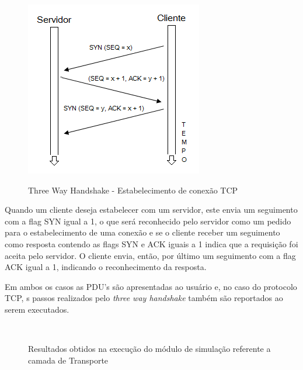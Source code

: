 \begin{figure}
	\centering
	\includegraphics{04-figuras/3wh.png}
	\caption{Three Way Handshake - Estabelecimento de conexão TCP}
	\cite{TANENBAUM}
	\label{fig:3wh}
\end{figure}

Quando um cliente deseja estabelecer  com  um servidor, este envia um seguimento com a flag SYN igual a 1, o que ser\'a reconhecido pelo servidor como um pedido para o estabelecimento de uma conex\~ao e se o cliente receber um seguimento como resposta contendo as flags SYN e ACK iguais a 1 indica que a requisiç\~ao foi aceita pelo servidor. O cliente envia, ent\~ao, por \'ultimo um seguimento com a flag ACK igual a 1, indicando o reconhecimento da resposta.

Em ambos os casos as PDU's são apresentadas ao usuário e, no caso do protocolo TCP, s passos realizados pelo \textit{three way handshake} também são reportados ao serem executados. 

\begin{figure}[H]
	\centering
	 \\
	\caption{Resultados obtidos na execução do módulo de simulação referente a camada de Transporte}
	\label{fig:transOutput}
\end{figure}